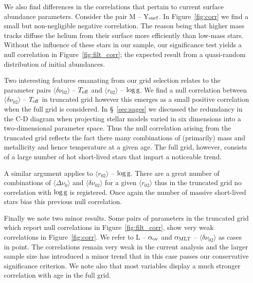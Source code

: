 We also find differences in the correlations that pertain to current surface abundance parameters. Consider the pair M -- Y$_{\rm{surf}}$. In Figure~\ref{fig:corr} we find a small but non-negligible negative correlation. The reason being that higher mass tracks diffuse the helium from their surface more efficiently than low-mass stars.  Without the influence of these stars in our sample, our significance test yields a null correlation in Figure~\ref{fig:filt_corr}; the expected result from a quasi-random distribution of initial abundances. 

Two interesting features emanating from our grid selection relates to the parameter pairs $\langle\delta\nu_{02}\rangle$ -- $T_{\rm{eff}}$ and $\langle r_{02}\rangle$ -- $\log \rm{g}$. 
We find a null correlation  between $\langle\delta\nu_{02}\rangle$ -- $T_{\rm{eff}}$ in truncated grid however this emerges as a small positive correlation when the full grid is considered. 
In \S~\ref{sec:sages} we discussed the redundancy in the C-D diagram when projecting stellar models varied in six dimensions into a two-dimensional parameter space.  Thus the  null correlation 
arising from the truncated grid reflects the fact there many combinations of (primarily) mass and metallicity and hence temperature at a given age.  
The full grid, however, consists of a large number of hot short-lived stars that impart a noticeable trend. 

A similar argument applies to $\langle r_{02}\rangle$ -- $\log \rm{g}$. There are a great number of combinations of $\langle\Delta\nu_0\rangle$ and
$\langle\delta\nu_{02}\rangle$ for a given $\langle r_{02}\rangle$ thus in the truncated grid no correlation with $\log \rm{g}$ is registered. 
Once again the number of massive short-lived stars bias this previous null correlation. 


Finally we note two minor results. Some pairs of parameters in the truncated grid which report null correlations in  Figure~\ref{fig:filt_corr},  show very weak correlations in Figure~\ref{fig:corr}. 
We refer to  L -- $\alpha_{\rm{ov}}$ and $\alpha_{\rm{MLT}}$ -- $\langle\delta\nu_{02}\rangle$ as cases in point. The correlations remain very weak in the current analysis and the larger sample size has introduced a minor trend that in this case passes our conservative significance criterion. We note also that most variables display a much stronger correlation with age in the full grid. 
 






